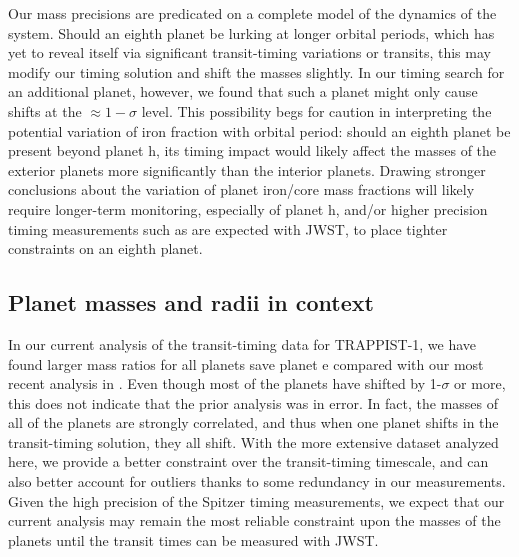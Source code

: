 \documentclass[twocolumn]{aastex63}
\begin{document}
Our mass precisions are predicated on a complete model of the dynamics of the system.  Should an eighth planet be lurking at longer orbital periods, which has yet to reveal itself via significant transit-timing variations or transits, this may modify our timing solution and shift the masses slightly.  In our timing search for an additional planet, however, we found that such a planet might only cause shifts at the ${\approx} 1{-}\sigma$ level.  This possibility begs for caution in interpreting the potential variation of iron fraction with orbital period:  should an eighth planet be present beyond planet h, its timing impact would likely affect the masses of the exterior planets more significantly than the interior planets.  Drawing stronger conclusions about the variation of planet iron/core mass fractions will likely require longer-term monitoring, especially of planet h, and/or higher precision timing measurements such as are expected with JWST, to place tighter constraints on an eighth planet.

\subsection{Planet masses and radii in context}

In our current analysis of the transit-timing data
for TRAPPIST-1, we have found larger mass ratios for
all planets save planet e compared with our most
recent analysis in \citet{Grimm2018}.  Even though
most of the planets have shifted by 1-$\sigma$ or more,
this does not indicate that the prior analysis was in
error.  In fact, the masses of all of the planets
are strongly correlated, and thus when one planet shifts
in the transit-timing solution, they all shift.  With
the more extensive dataset analyzed here, we provide
a better constraint over the transit-timing timescale,
and can also better account for outliers thanks to some
redundancy in our measurements. Given the high precision of
the Spitzer timing measurements, we expect that our current
analysis may remain the most reliable constraint upon the
masses of the planets until the transit times can be measured
with JWST.


\end{document}
